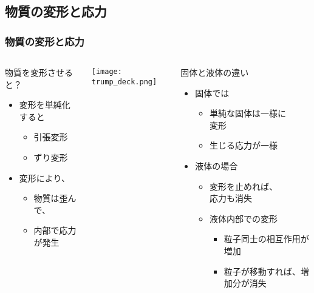 \documentclass[12pt, dvipdfmx]{beamer}
\begin{document}
\subsection{物質の変形と応力}
\begin{frame}
	\frametitle{物質の変形と応力}
		\begin{columns}[T, onlytextwidth]
				\begin{block}{物質を変形させると？}
					\begin{itemize}
						\item 変形を単純化すると
						\begin{itemize}
							\item 引張変形
							\item ずり変形
						\end{itemize}
						\item 変形により、
						\begin{itemize}
							\item 物質は歪んで、
							\item 内部で応力が発生
						\end{itemize}
					\end{itemize}
				\end{block}
				\begin{center}
					\texttt{[image: trump\_deck.png]}
				\end{center}
				\begin{exampleblock}{固体と液体の違い}
					\begin{itemize}
						\item 固体では
						\begin{itemize}
							\item 単純な固体は一様に\\変形
							\item 生じる応力が一様
						\end{itemize}
						\item 液体の場合
						\begin{itemize}
							\item 変形を止めれば、\\応力も消失
							\item 液体内部での変形
							\begin{itemize}
								\item 粒子同士の相互作用が増加
								\item 粒子が移動すれば、増加分が消失
							\end{itemize}
						\end{itemize}
					\end{itemize}
				\end{exampleblock}
		\end{columns}
\end{frame}
\end{document}
